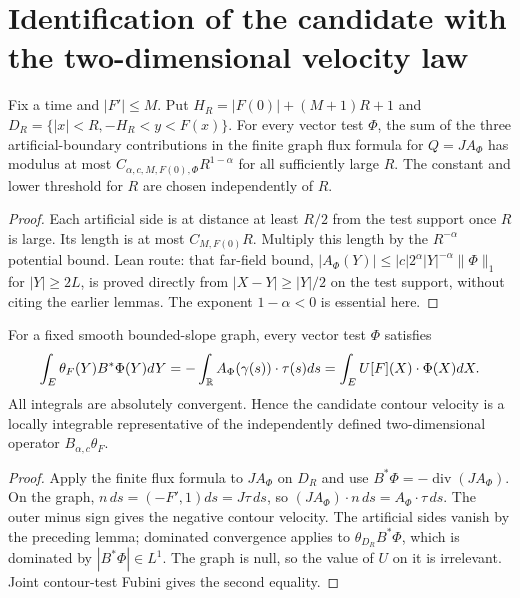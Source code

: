 \section{Identification of the candidate with the two-dimensional velocity law}
\label{sec:c13_velocity_law}

\begin{lemma}
  \label{lem:c13_truncation_boundary_error}
  Fix a time and $|F'|\le M$. Put $H_R=|F(0)|+(M+1)R+1$ and
  $D_R=\{|x|<R,-H_R<y<F(x)\}$.
  For every vector test $\Phi$, the sum of the three artificial-boundary contributions
  in the finite graph flux formula for $Q=J A_\Phi$ has modulus at most
  $C_{\alpha,c,M,F(0),\Phi}R^{1-\alpha}$ for all sufficiently large $R$.
  The constant and lower threshold for $R$ are chosen independently of $R$.
\end{lemma}
\begin{proof}
  Each artificial side is at distance at least $R/2$ from the test support once $R$ is large.
  Its length is at most $C_{M,F(0)}R$. Multiply this length by the $R^{-\alpha}$ potential bound.
  Lean route: that far-field bound, $|A_\Phi(Y)|\le|c|2^\alpha|Y|^{-\alpha}\|\Phi\|_1$ for
  $|Y|\ge2L$, is proved directly from $|X-Y|\ge|Y|/2$ on the test support, without citing the earlier lemmas.
  The exponent $1-\alpha<0$ is essential here.
\end{proof}

\begin{lemma}
  \label{lem:c13_bulk_contour_identity}
  For a fixed smooth bounded-slope graph, every vector test $\Phi$ satisfies
  \[
    \int_E\theta_F(Y)B^*\Phi(Y)dY
      =-\int_{\mathbb{R}} A_\Phi(\gamma(s))\cdot\tau(s)ds
      =\int_E U[F](X)\cdot\Phi(X)dX.
  \]
  All integrals are absolutely convergent. Hence the candidate contour velocity is a locally
  integrable representative of the independently defined two-dimensional operator $B_{\alpha,c}\theta_F$.
\end{lemma}
\begin{proof}
  Apply the finite flux formula to $J A_\Phi$ on $D_R$ and use $B^*\Phi=-\operatorname{div}(JA_\Phi)$.
  On the graph, $n\,ds=(-F',1)ds=J\tau\,ds$, so $(JA_\Phi)\cdot n\,ds=A_\Phi\cdot\tau\,ds$.
  The outer minus sign gives the negative contour velocity. The artificial sides vanish by the
  preceding lemma; dominated convergence applies to $\theta_{D_R}B^*\Phi$, which is dominated by
  $|B^*\Phi|\in L^1$. The graph is null, so the value of $U$ on it is irrelevant.
  Joint contour-test Fubini gives the second equality.
\end{proof}

